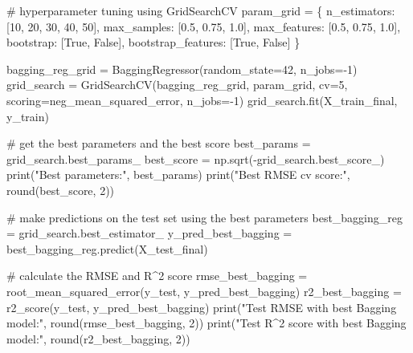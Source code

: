 \documentclass[
  letterpaper,
  DIV=11,
  numbers=noendperiod]{scrreprt}
\newenvironment{Shaded}{\begin{snugshade}}{\end{snugshade}}
\newcommand{\BuiltInTok}[1]{\textcolor[rgb]{0.00,0.23,0.31}{#1}}
\newcommand{\CommentTok}[1]{\textcolor[rgb]{0.37,0.37,0.37}{#1}}
\newcommand{\DecValTok}[1]{\textcolor[rgb]{0.68,0.00,0.00}{#1}}
\newcommand{\FloatTok}[1]{\textcolor[rgb]{0.68,0.00,0.00}{#1}}
\newcommand{\NormalTok}[1]{\textcolor[rgb]{0.00,0.23,0.31}{#1}}
\newcommand{\OperatorTok}[1]{\textcolor[rgb]{0.37,0.37,0.37}{#1}}
\newcommand{\StringTok}[1]{\textcolor[rgb]{0.13,0.47,0.30}{#1}}
\newcommand{\VariableTok}[1]{\textcolor[rgb]{0.07,0.07,0.07}{#1}}
\begin{document}
\begin{Shaded}
\begin{Highlighting}[]
\CommentTok{\# hyperparameter tuning using GridSearchCV}
\NormalTok{param\_grid }\OperatorTok{=}\NormalTok{ \{}
    \StringTok{\textquotesingle{}n\_estimators\textquotesingle{}}\NormalTok{: [}\DecValTok{10}\NormalTok{, }\DecValTok{20}\NormalTok{, }\DecValTok{30}\NormalTok{, }\DecValTok{40}\NormalTok{, }\DecValTok{50}\NormalTok{],}
    \StringTok{\textquotesingle{}max\_samples\textquotesingle{}}\NormalTok{: [}\FloatTok{0.5}\NormalTok{, }\FloatTok{0.75}\NormalTok{, }\FloatTok{1.0}\NormalTok{],}
    \StringTok{\textquotesingle{}max\_features\textquotesingle{}}\NormalTok{: [}\FloatTok{0.5}\NormalTok{, }\FloatTok{0.75}\NormalTok{, }\FloatTok{1.0}\NormalTok{],}
    \StringTok{\textquotesingle{}bootstrap\textquotesingle{}}\NormalTok{: [}\VariableTok{True}\NormalTok{, }\VariableTok{False}\NormalTok{],}
    \StringTok{\textquotesingle{}bootstrap\_features\textquotesingle{}}\NormalTok{: [}\VariableTok{True}\NormalTok{, }\VariableTok{False}\NormalTok{]}
\NormalTok{\}}

\NormalTok{bagging\_reg\_grid }\OperatorTok{=}\NormalTok{ BaggingRegressor(random\_state}\OperatorTok{=}\DecValTok{42}\NormalTok{, n\_jobs}\OperatorTok{={-}}\DecValTok{1}\NormalTok{)}
\NormalTok{grid\_search }\OperatorTok{=}\NormalTok{ GridSearchCV(bagging\_reg\_grid, param\_grid, cv}\OperatorTok{=}\DecValTok{5}\NormalTok{, scoring}\OperatorTok{=}\StringTok{\textquotesingle{}neg\_mean\_squared\_error\textquotesingle{}}\NormalTok{, n\_jobs}\OperatorTok{={-}}\DecValTok{1}\NormalTok{)}
\NormalTok{grid\_search.fit(X\_train\_final, y\_train)}

\CommentTok{\# get the best parameters and the best score}
\NormalTok{best\_params }\OperatorTok{=}\NormalTok{ grid\_search.best\_params\_}
\NormalTok{best\_score }\OperatorTok{=}\NormalTok{ np.sqrt(}\OperatorTok{{-}}\NormalTok{grid\_search.best\_score\_)}
\BuiltInTok{print}\NormalTok{(}\StringTok{"Best parameters:"}\NormalTok{, best\_params)}
\BuiltInTok{print}\NormalTok{(}\StringTok{"Best RMSE cv score:"}\NormalTok{, }\BuiltInTok{round}\NormalTok{(best\_score, }\DecValTok{2}\NormalTok{))}

\CommentTok{\# make predictions on the test set using the best parameters}
\NormalTok{best\_bagging\_reg }\OperatorTok{=}\NormalTok{ grid\_search.best\_estimator\_}
\NormalTok{y\_pred\_best\_bagging }\OperatorTok{=}\NormalTok{ best\_bagging\_reg.predict(X\_test\_final)}

\CommentTok{\# calculate the RMSE and R\^{}2 score}
\NormalTok{rmse\_best\_bagging }\OperatorTok{=}\NormalTok{ root\_mean\_squared\_error(y\_test, y\_pred\_best\_bagging)}
\NormalTok{r2\_best\_bagging }\OperatorTok{=}\NormalTok{ r2\_score(y\_test, y\_pred\_best\_bagging)}
\BuiltInTok{print}\NormalTok{(}\StringTok{"Test RMSE with best Bagging model:"}\NormalTok{, }\BuiltInTok{round}\NormalTok{(rmse\_best\_bagging, }\DecValTok{2}\NormalTok{))}
\BuiltInTok{print}\NormalTok{(}\StringTok{"Test R\^{}2 score with best Bagging model:"}\NormalTok{, }\BuiltInTok{round}\NormalTok{(r2\_best\_bagging, }\DecValTok{2}\NormalTok{))}


\end{Highlighting}
\end{Shaded}
\end{document}
